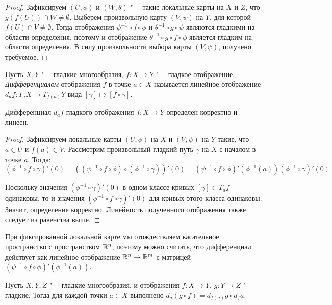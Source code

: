 \begin{proof}
	Зафиксируем $(U, \phi)$ и $(W, \theta)$ "--- такие локальные карты на $X$ и $Z$, что $g(f(U)) \cap W \ne \emptyset$. Выберем произвольную карту $(V, \psi)$ на $Y$, для которой $f(U) \cap V \ne \emptyset$. Тогда отображения $\psi^{-1} \circ f \circ \phi$ и $\theta^{-1} \circ g \circ \psi$ являются гладкими на области определения, поэтому и отображение $\theta^{-1} \circ g \circ f \circ \phi$ является гладким на области определения. В силу произвольности выбора карты $(V, \psi)$, получено требуемое.
\end{proof}

\begin{definition}
	Пусть $X, Y$ "--- гладкие многообразия, $f : X \to Y$ "--- гладкое отображение. \textit{Дифференциалом} отображения $f$ в точке $a \in X$ называется линейное отображение $d_af: T_aX \to T_{f(a)}Y$ вида $[\gamma] \mapsto [f \circ \gamma]$.
\end{definition}

\begin{proposition}
	Дифференциал $d_af$ гладкого отображения $f: X \to Y$ определен корректно и линеен.
\end{proposition}

\begin{proof}
	Зафиксируем локальные карты $(U, \phi)$ на $X$ и $(V, \psi)$ на $Y$ такие, что $a \in U$ и $f(a) \in V$. Рассмотрим произвольный гладкий путь $\gamma$ на $X$ с началом в точке $a$. Тогда:
	\[(\phi^{-1} \circ f \circ \gamma)'(0) = \left((\psi^{-1} \circ f \circ \phi) \circ (\phi^{-1} \circ \gamma)\right)'(0) = (\psi^{-1} \circ f \circ \phi)'(\phi^{-1}(a))(\phi^{-1} \circ \gamma)'(0)\]
	
	Поскольку значения $(\phi^{-1} \circ \gamma)'(0)$ в одном классе кривых $[\gamma] \in T_af$ одинаковы, то и значения $(\phi^{-1} \circ f \circ \gamma)'(0)$ для кривых этого класса одинаковы. Значит, определение корректно. Линейность полученного отображения также следует из равенства выше.
\end{proof}

\begin{note}
	При фиксированной локальной карте мы отождествляем касательное пространство с пространством $\mathbb{R}^n$, поэтому можно считать, что дифференциал действует как линейное отображение $\mathbb{R}^n \to \mathbb{R}^m$ с матрицей $(\psi^{-1} \circ f \circ \phi)'(\phi^{-1}(a))$.
\end{note}

\begin{proposition}
	Пусть $X, Y, Z$ "--- гладкие многообразия, и отображения $f : X \to Y$, $g : Y \to Z$ "--- гладкие. Тогда для каждой точки $a \in X$ выполнено $d_a(g\circ f) = d_{f(a)}g \circ d_fa$.
\end{proposition}

